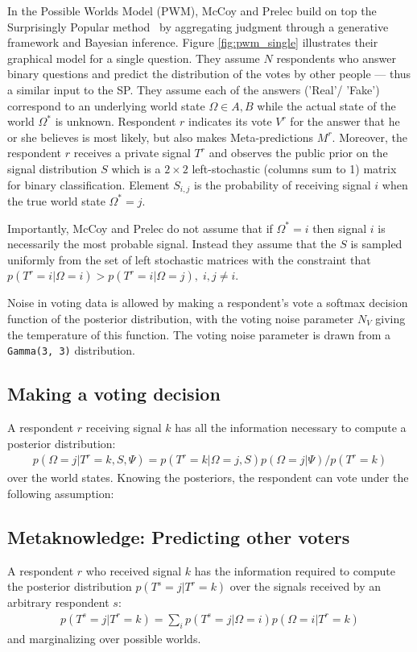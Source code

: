 \documentclass{report}
\theoremstyle{definition}
\begin{document}
In the Possible Worlds Model (PWM), McCoy and Prelec build on top the Surprisingly Popular method~\cite{mccoy:stat} by aggregating judgment through a generative framework and Bayesian inference. Figure \ref{fig:pwm_single} illustrates their graphical model for a single question. They assume $N$ respondents who answer binary questions and predict the distribution of the votes by other people --- thus a similar input to the SP. They assume each of the answers ('Real'/ 'Fake') correspond to an underlying world state $\Omega \in {A, B} $ while the actual state of the world $\Omega^*$ is unknown. Respondent $r$ indicates its vote $V^r$ for the answer that he or she believes is most likely, but also makes Meta-predictions $M^r$. Moreover, the respondent $r$ receives a private signal $T^r$ and observes the public prior on the signal distribution $S$ which is a $2 \times 2$ left-stochastic (columns sum to 1) matrix for binary classification. Element $S_{i,j}$ is the probability of receiving signal $i$ when the true world state $\Omega^* = j$.

Importantly, McCoy and Prelec do not assume that if $\Omega^* = i$ then signal $i$ is necessarily the most probable signal. Instead they assume that the $S$ is sampled uniformly from the set of left stochastic matrices with the constraint that $ p(T^r = i| \Omega = i) > p(T^r = i| \Omega = j), \; i, j \neq i $.

Noise in voting data is allowed by making a respondent’s vote a softmax decision function of the posterior distribution, with the voting noise parameter $N_V$ giving the temperature of this function. The voting noise parameter is drawn from a \texttt{Gamma(3, 3)} distribution.

\subsection{Making a voting decision}

A respondent
$r$ receiving signal $k$ has all the information necessary to compute
a posterior distribution: 
\begin{align}
p(\Omega=j|T^{r}=k,S,\Psi)=p(T^{r}=k|\Omega=j,S)p(\Omega=j|\Psi)/p(T^{r}=k)
\end{align}
over the world states. Knowing the posteriors, the respondent can vote under the following assumption:



\subsection{Metaknowledge: Predicting other voters}
A respondent $r$ who received signal $k$
has the information required to compute the posterior distribution
$p(T^{s}=j|T^{r}=k)$ over the signals received by an arbitrary respondent
$s$: 
\begin{align}
    p(T^{s}=j|T^{r}=k)=\sum_{i}p(T^{s}=j|\Omega=i)p(\Omega=i|T^{r}=k)
\end{align}
and marginalizing over possible worlds.
\end{document}
